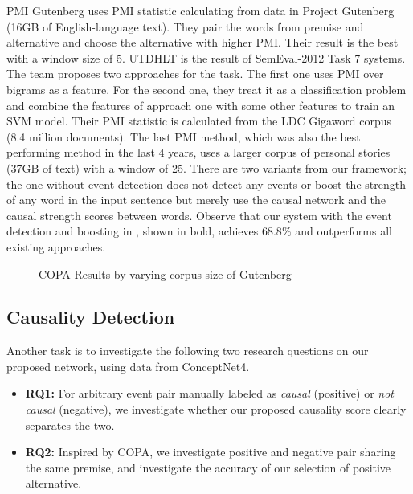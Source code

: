 PMI Gutenberg uses PMI statistic calculating from data in 
Project Gutenberg (16GB of
English-language text). They pair the words from premise and
alternative and choose the alternative with higher PMI. Their result
is the best with a window size of 5. UTDHLT is the result of
SemEval-2012 Task 7 systems. The team proposes two approaches for
the task. The first one uses PMI over bigrams as a feature. For the
second one, they treat it as a classification problem and combine
the features of approach one with some other features to train an
SVM model. Their PMI statistic is calculated from the LDC Gigaword
corpus (8.4 million documents). 
 The last PMI method, which was also the best
performing method in the last 4 years, uses a larger corpus of
personal stories (37GB of text) with a window of 25. 
There are two variants from our framework; the one without event
detection does not detect any events or boost the strength of
any word in the input sentence but merely use the causal network
and the causal strength scores between words. Observe that
our system with the event detection and boosting in , 
shown in bold, achieves $68.8\%$ and outperforms all
existing approaches.


\begin{figure}[th]
\centering
{}
\caption{COPA Results by varying corpus size of Gutenberg }

\label{fig:gu_pmi_1}
\end{figure}

\subsection{Causality Detection}
Another task is to investigate the following two research
questions on our proposed network, using data from ConceptNet4.

\begin{itemize}
\item {\bf RQ1:} For arbitrary event pair manually labeled as \emph{causal} (positive) or \emph{not causal} (negative), we investigate whether our proposed causality score clearly separates the two.
\item {\bf RQ2:} Inspired by COPA, we investigate positive and negative pair sharing the same premise, and investigate the accuracy of our selection of positive
alternative.
\end{itemize}

